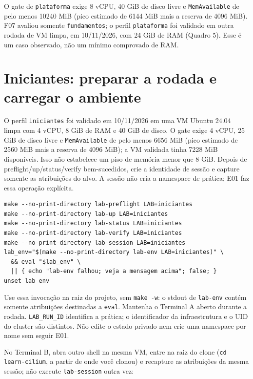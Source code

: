 \documentclass[12pt,openany,oneside,a4paper,chapter=TITLE,english,brazil]{abntex2}
\begin{document}
\begin{apendicesenv}
O gate de \texttt{plataforma} exige 8 vCPU, 40 GiB de disco livre e \texttt{Mem\allowbreak{}Available} de
pelo menos 10240 MiB (pico estimado de 6144 MiB mais a reserva de 4096 MiB).
F07 avaliou somente \texttt{fundamentos}; o perfil \texttt{plataforma} foi validado em outra
rodada de VM limpa, em 10/11/2026, com 24 GiB de RAM (Quadro 5). Esse é um
caso observado, não um mínimo comprovado de RAM.

\section*{Iniciantes: preparar a rodada e carregar o ambiente}\label{iniciantes-preparar-a-rodada-e-carregar-o-ambiente}

O perfil \texttt{iniciantes} foi validado em 10/11/2026 em uma VM Ubuntu 24.04 limpa
com 4 vCPU, 8 GiB de RAM e 40 GiB de disco. O gate exige 4 vCPU, 25 GiB de disco
livre e \texttt{Mem\allowbreak{}Available} de pelo menos 6656 MiB (pico estimado de 2560 MiB mais a
reserva de 4096 MiB); a VM validada tinha 7228 MiB disponíveis. Isso não
estabelece um piso de memória menor que 8 GiB. Depois de preflight/up/status/verify bem-sucedidos,
crie a identidade de sessão e capture somente as atribuições do alvo. A sessão
não cria a namespace de prática; E01 faz essa operação explícita.

\begin{verbatim}
make --no-print-directory lab-preflight LAB=iniciantes
make --no-print-directory lab-up LAB=iniciantes
make --no-print-directory lab-status LAB=iniciantes
make --no-print-directory lab-verify LAB=iniciantes
make --no-print-directory lab-session LAB=iniciantes
lab_env="$(make --no-print-directory lab-env LAB=iniciantes)" \
  && eval "$lab_env" \
  || { echo "lab-env falhou; veja a mensagem acima"; false; }
unset lab_env
\end{verbatim}

Use essa invocação na raiz do projeto, sem \texttt{make -{}\allowbreak{}w}: o stdout de
\texttt{lab-{}\allowbreak{}env} contém somente atribuições destinadas a \texttt{eval}. Mantenha o Terminal A
aberto durante a rodada. \texttt{LAB\_\allowbreak{}RUN\_\allowbreak{}ID} identifica a prática; o identificador da
infraestrutura e o UID do cluster são distintos. Não edite o estado privado nem
crie uma namespace por nome sem seguir E01.

No Terminal B, abra outro shell na mesma VM, entre na raiz do clone (\texttt{cd learn-{}\allowbreak{}cilium},
a partir de onde você clonou) e recapture as atribuições da mesma sessão; não
execute \texttt{lab-{}\allowbreak{}session} outra vez:


\end{apendicesenv}
\end{document}
